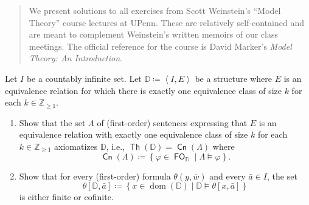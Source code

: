 \documentclass[10pt,letterpaper,cm]{nupset}
\theoremstyle{definition}
\theoremstyle{theorem}
\theoremstyle{remark}
\newcommand{\D}{\mathbb D}
\newcommand{\Z}{\mathbb Z}
\newcommand{\1}{\mathbb{1}}
\newcommand{\0}{\vec 0}
\DeclareMathOperator{\dom}{dom}
\DeclareMathOperator{\thh}{\mathsf{Th}}
\DeclareMathOperator{\cn}{\mathsf{Cn}}
\DeclareMathOperator{\fo}{\mathsf{FO}}
\newcommand{\be}{\begin{enumerate}}
\newcommand{\ee}{\end{enumerate}}
\begin{document}
\begin{abstract}
We present solutions to all exercises from Scott Weinstein's ``Model Theory'' course lectures at UPenn. These are relatively self-contained and are meant to complement Weinstein's written memoirs of our class meetings. The official reference for the course is David Marker's \textit{Model Theory: An Introduction}.
\end{abstract}

\begin{problem}[1.] 
Let $I$ be a countably infinite set. Let $\D \coloneqq \left\langle I, E\right\rangle$ be a structure where $E$ is an equivalence relation for which  there is exactly one equivalence class of size $k$ for each $k\in \Z_{\geq 1}$.
\be[label=(\arabic*)]
\item Show that the set $\Lambda$ of (first-order) sentences expressing that $E$ is an equivalence relation with exactly one equivalence class of size $k$ for each $k\in \Z_{\geq 1}$ axiomatizes $\D$, i.e., $\thh(\D) = \cn(\Lambda)$ where 
\[
\cn(\Lambda) \coloneqq  \left\{\varphi \in \fo_{\D} \mid \Lambda \models \varphi\right\}
.\]
\item Show that for every (first-order) formula $\theta(y, \overline{w})$ and every $\bar{a}\in I$, the set $$\theta\left[\D, \bar{a}\right] \coloneqq \left\{x\in \dom(\D) \mid \D\models \theta\left[x, \bar{a}\right]\right\}$$ is either finite or cofinite.
\ee
\end{problem}
\end{document}
